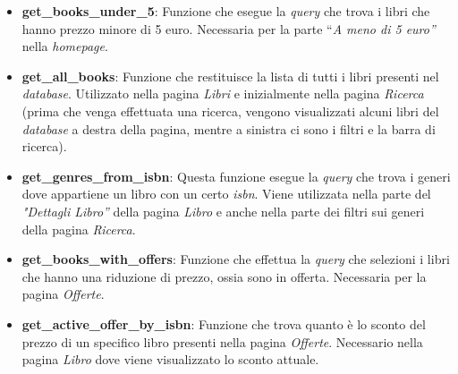 \begin{itemize}
	\item \textbf{get\_books\_under\_5}: Funzione che esegue la \textit{query} che trova i libri che hanno prezzo minore di 5 euro. Necessaria per la parte “\textit{A meno di 5 euro”} nella \textit{homepage}.
	\item \textbf{get\_all\_books}: Funzione che restituisce la lista di tutti i libri presenti nel \textit{database}. Utilizzato nella pagina \textit{Libri} e inizialmente nella pagina \textit{Ricerca} (prima che venga effettuata una ricerca, vengono visualizzati alcuni libri del \textit{database} a destra della pagina, mentre a sinistra ci sono i filtri e la barra di ricerca).
	\item \textbf{get\_genres\_from\_isbn}: Questa funzione esegue la \textit{query} che trova i generi dove appartiene un libro con un certo \textit{isbn}. Viene utilizzata nella parte del \textit{"Dettagli Libro”} della pagina \textit{Libro} e anche nella parte dei filtri sui generi della pagina \textit{Ricerca}.
	\item \textbf{get\_books\_with\_offers}: Funzione che effettua la \textit{query} che selezioni i libri che hanno una riduzione di prezzo, ossia sono in offerta. Necessaria per la pagina \textit{Offerte}.
	\item \textbf{get\_active\_offer\_by\_isbn}: Funzione che trova quanto è lo sconto del prezzo di un specifico libro presenti nella pagina \textit{Offerte}. Necessario nella pagina \textit{Libro} dove viene visualizzato lo sconto attuale.
\end{itemize}

